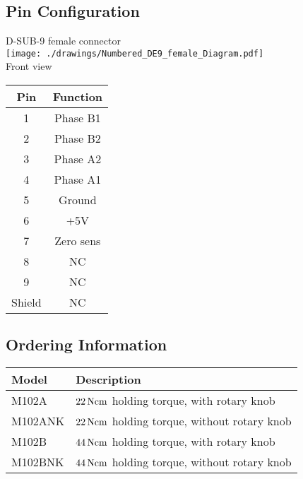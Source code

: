 \documentclass[a4paper, final, 12pt, oneside]{scrartcl}
\numberwithin{equation}{section}
\numberwithin{table}{section}
\numberwithin{figure}{section}
\begin{document}
\subsection*{Pin Configuration}
\begin{minipage}{\textwidth}
  \begin{minipage}[b]{0.49\textwidth}
    \centering
    D-SUB-9 female connector\\
    \texttt{[image: ./drawings/Numbered\_DE9\_female\_Diagram.pdf]}\\
    Front view
  \end{minipage}
  \hfill
  \begin{minipage}[b]{0.49\textwidth}
    \centering
    \begin{tabular}{cc}
      \toprule
      \textbf{Pin} & \textbf{Function} \\
      \toprule
      1 & Phase B1 \\ \midrule
      2 & Phase B2\\ \midrule
      3 & Phase A2 \\ \midrule
      4 & Phase A1 \\ \midrule
      5 & Ground \\ \midrule
      6 & +5V \\ \midrule
      7 & Zero sens \\ \midrule
      8 & NC \\ \midrule
      9 & NC \\ \midrule
      Shield & NC \\
      \bottomrule
    \end{tabular}
  \end{minipage}
\end{minipage}
\FloatBarrier

\subsection*{Ordering Information}
\begin{table}[!hp]
  \begin{tabular}{ll}
    \toprule
    \textbf{Model} & \textbf{Description}\\
    \toprule
    M102A   & $\unit[22]{Ncm}$ holding torque, with rotary knob \\
    M102ANK & $\unit[22]{Ncm}$ holding torque, without rotary knob \\
    M102B   & $\unit[44]{Ncm}$ holding torque, with rotary knob \\
    M102BNK & $\unit[44]{Ncm}$ holding torque, without rotary knob \\
    \bottomrule
  \end{tabular}
\end{table}















\FloatBarrier
\vfill
\end{document}
